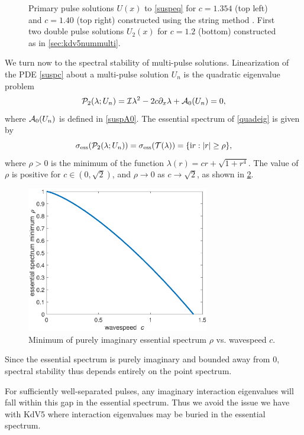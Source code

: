 \documentclass[thesis.tex]{subfiles}
\begin{document}
\begin{figure}
\begin{tabular}{cc}
\end{tabular}
\caption[Primary pulse solutions to Chen-McKenna]{Primary pulse solutions $U(x)$ to \cref{suspeq} for $c = 1.354$ (top left) and $c = 1.40$ (top right) constructed using the string method \cite{Chamard2011}. First two double pulse solutions $U_2(x)$ for $c = 1.2$ (bottom) constructed as in \cref{sec:kdv5nummulti}.}
\label{fig:chen1}
\end{figure}

We turn now to the spectral stability of multi-pulse solutions. Linearization of the PDE \cref{suspc} about a multi-pulse solution $U_n$ is the quadratic eigenvalue problem
\begin{equation}\label{quadeig}
\mathcal{P}_2(\lambda; U_n) = \mathcal{I} \lambda^2 - 2 c \partial_x \lambda + \mathcal{A}_0(U_n) = 0,
\end{equation}
where $\mathcal{A}_0(U_n)$ is defined in \cref{suspA0}. The essential spectrum of \cref{quadeig} is given by
\begin{equation}\label{quadess}
\sigma_{\mathrm{ess}}(\mathcal{P}_2(\lambda; U_n)) = \sigma_{\mathrm{ess}}(\mathcal{T}(\lambda)) = \{\mathrm{i} r : |r| \geq \rho \},
\end{equation}
where $\rho > 0$ is the minimum of the function $\lambda(r) = c r + \sqrt{1 + r^4}$. The value of $\rho$ is positive for $c \in (0, \sqrt{2})$, and $\rho\to 0$ as $c\to\sqrt{2}$, as shown in \cref{fig:essspecrho}.
\begin{figure}
\centering
\includegraphics[width=8cm]{images/other/essspecrho.eps}
\caption[Essential spectrum bound for Chen-McKenna]{Minimum of purely imaginary essential spectrum $\rho$ vs. wavespeed $c$.}
\label{fig:essspecrho}
\end{figure}
Since the essential spectrum is purely imaginary and bounded away from 0, spectral stability thus depends entirely on the point spectrum.

For sufficiently well-separated pulses, any imaginary interaction eigenvalues will fall within this gap in the essential spectrum. Thus we avoid the issue we have with KdV5 where interaction eigenvalues may be buried in the essential spectrum. 
\end{document}
